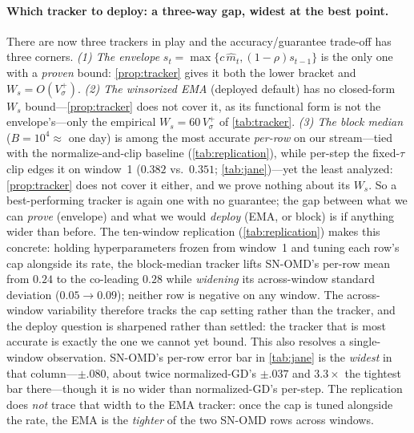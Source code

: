 \documentclass{article}
\begin{document}
\paragraph{Which tracker to deploy: a three-way gap, widest at the best point.} There are
now three trackers in play and the accuracy/guarantee trade-off has three corners.
\emph{(1) The envelope} $s_t=\max\{c\,\hat m_t,(1-\rho)s_{t-1}\}$ is the only one with a
\emph{proven} bound: \cref{prop:tracker} gives it both the lower bracket and
$W_s=O(V_\sigma^+)$. \emph{(2) The winsorized EMA} (deployed default) has no closed-form
$W_s$ bound---\cref{prop:tracker} does not cover it, as its functional form is not the
envelope's---only the empirical $W_s=60\,V_\sigma^+$ of \cref{tab:tracker}. \emph{(3) The
block median} ($B{=}10^4\approx$ one day) is among the most accurate \emph{per-row} on our
stream---tied with the normalize-and-clip baseline (\cref{tab:replication}), while per-step
the fixed-$\tau$ clip edges it on window~1 ($0.382$ vs.\ $0.351$; \cref{tab:jane})---yet
the least analyzed: \cref{prop:tracker} does not cover it either, and we prove nothing about its
$W_s$. So a best-performing tracker is again one with no guarantee; the gap between what we
can \emph{prove} (envelope) and what we would \emph{deploy} (EMA, or block) is if anything
wider than before. The ten-window replication (\cref{tab:replication}) makes this concrete:
holding hyperparameters frozen from window~1 and tuning each row's cap alongside its rate, the
block-median tracker lifts SN-OMD's per-row mean from $0.24$ to the co-leading $0.28$ while
\emph{widening} its across-window standard deviation ($0.05\!\to\!0.09$); neither row is
negative on any window. The across-window variability therefore tracks the cap setting rather
than the tracker, and the deploy question is sharpened rather than settled: the tracker that is
most accurate is exactly the one we cannot yet bound. This also resolves a single-window
observation. SN-OMD's per-row error bar in \cref{tab:jane} is the \emph{widest} in that
column---$\pm.080$, about twice normalized-GD's $\pm.037$ and $3.3\times$ the tightest bar
there---though it is no wider than normalized-GD's per-step. The replication does \emph{not}
trace that width to the EMA tracker: once the cap is tuned alongside the rate, the EMA is the
\emph{tighter} of the two SN-OMD rows across windows.
\end{document}
